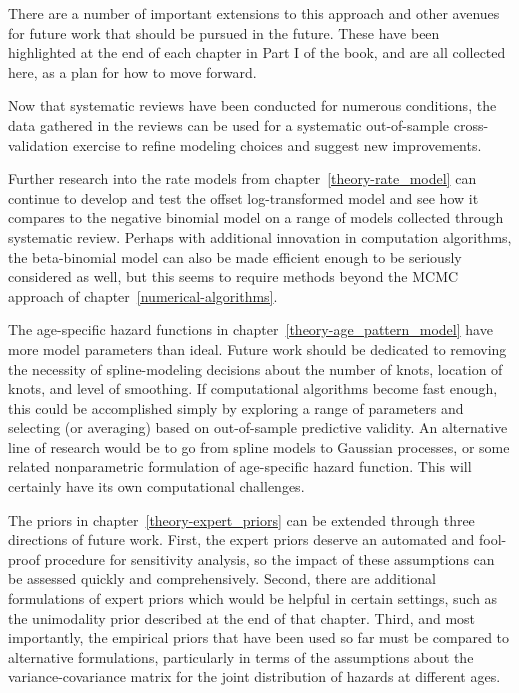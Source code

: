 There are a number of important extensions to this approach and other
avenues for future work that should be pursued in the future.  These
have been highlighted at the end of each chapter in Part I of the
book, and are all collected here, as a plan for how to move forward.

Now that systematic reviews have been conducted for numerous
conditions, the data gathered in the reviews can be used for a
systematic out-of-sample cross-validation exercise to refine modeling
choices and suggest new improvements.

Further research into the rate models from
chapter~\ref{theory-rate_model} can continue to develop and test the
offset log-transformed model and see how it compares to the negative
binomial model on a range of models collected through systematic
review.  Perhaps with additional innovation in computation algorithms,
the beta-binomial model can also be made efficient enough to be
seriously considered as well, but this seems to require methods beyond
the MCMC approach of chapter~\ref{numerical-algorithms}.

The age-specific hazard functions in
chapter~\ref{theory-age_pattern_model} have more model parameters than
ideal.  Future work should be dedicated to removing the necessity of
spline-modeling decisions about the number of knots, location of
knots, and level of smoothing.  If computational algorithms become
fast enough, this could be accomplished simply by exploring a range of
parameters and selecting (or averaging) based on out-of-sample
predictive validity.  An alternative line of research would be to go
from spline models to Gaussian processes, or some related
nonparametric formulation of age-specific hazard function.  This will
certainly have its own computational challenges.

The priors in chapter~\ref{theory-expert_priors} can be extended
through three directions of future work. First, the expert priors
deserve an automated and fool-proof procedure for sensitivity
analysis, so the impact of these assumptions can be assessed quickly
and comprehensively. Second, there are additional formulations of
expert priors which would be helpful in certain settings, such as the
unimodality prior described at the end of that chapter.  Third, and
most importantly, the empirical priors that have been used so far must
be compared to alternative formulations, particularly in terms of the
assumptions about the variance-covariance matrix for the joint
distribution of hazards at different ages.

